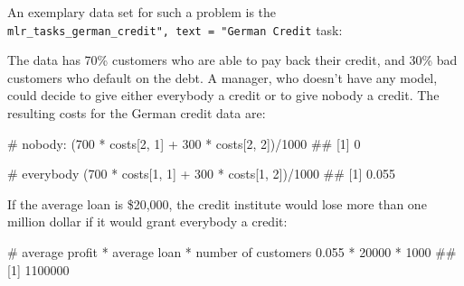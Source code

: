 \documentclass[
  11pt,
  parskip=half,
  DIV=calc,
  BCOR=10mm,
  x11names]{scrbook}
\newenvironment{Shaded}{}{}
\newcommand{\CommentTok}[1]{\textcolor[rgb]{0.00,0.50,0.00}{#1}}
\newcommand{\DecValTok}[1]{#1}
\newcommand{\FloatTok}[1]{#1}
\newcommand{\KeywordTok}[1]{\textcolor[rgb]{0.00,0.00,1.00}{#1}}
\newcommand{\NormalTok}[1]{#1}
\newcommand{\OperatorTok}[1]{#1}
\newcommand{\StringTok}[1]{\textcolor[rgb]{0.00,0.50,0.50}{#1}}
\begin{document}
An exemplary data set for such a problem is the \texttt{mlr\_tasks\_german\_credit",\ text\ =\ "German\ Credit} task:

\begin{Shaded}
\end{Shaded}

The data has 70\% customers who are able to pay back their credit, and 30\% bad customers who default on the debt.
A manager, who doesn't have any model, could decide to give either everybody a credit or to give nobody a credit.
The resulting costs for the German credit data are:

\begin{Shaded}
\begin{Highlighting}[]
\CommentTok{# nobody:}
\NormalTok{(}\DecValTok{700} \OperatorTok{*}\StringTok{ }\NormalTok{costs[}\DecValTok{2}\NormalTok{, }\DecValTok{1}\NormalTok{] }\OperatorTok{+}\StringTok{ }\DecValTok{300} \OperatorTok{*}\StringTok{ }\NormalTok{costs[}\DecValTok{2}\NormalTok{, }\DecValTok{2}\NormalTok{])}\OperatorTok{/}\DecValTok{1000}
\NormalTok{## [1] 0}

\CommentTok{# everybody}
\NormalTok{(}\DecValTok{700} \OperatorTok{*}\StringTok{ }\NormalTok{costs[}\DecValTok{1}\NormalTok{, }\DecValTok{1}\NormalTok{] }\OperatorTok{+}\StringTok{ }\DecValTok{300} \OperatorTok{*}\StringTok{ }\NormalTok{costs[}\DecValTok{1}\NormalTok{, }\DecValTok{2}\NormalTok{])}\OperatorTok{/}\DecValTok{1000}
\NormalTok{## [1] 0.055}
\end{Highlighting}
\end{Shaded}

If the average loan is \$20,000, the credit institute would lose more than one million dollar if it would grant everybody a credit:

\begin{Shaded}
\begin{Highlighting}[]
\CommentTok{# average profit * average loan * number of customers}
\FloatTok{0.055} \OperatorTok{*}\StringTok{ }\DecValTok{20000} \OperatorTok{*}\StringTok{ }\DecValTok{1000}
\NormalTok{## [1] 1100000}
\end{Highlighting}
\end{Shaded}
\end{document}
